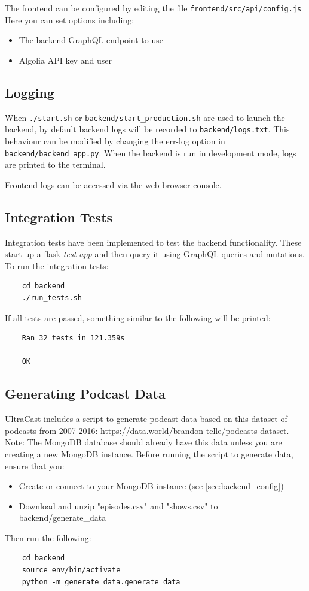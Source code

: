 \documentclass[../report.tex]{subfiles}
\begin{document}
The frontend can be configured by editing the file \verb|frontend/src/api/config.js| Here you can set options including:
\begin{itemize}
    \item The backend GraphQL endpoint to use
    \item Algolia API key and user
\end{itemize}

\subsection{Logging}

When \verb|./start.sh| or \verb|backend/start_production.sh| are used to launch the backend, by default backend logs will be recorded to \verb|backend/logs.txt|.
This behaviour can be modified by changing the err-log option in \verb|backend/backend_app.py|.
When the backend is run in development mode, logs are printed to the terminal.

Frontend logs can be accessed via the web-browser console.

\subsection{Integration Tests}

Integration tests have been implemented to test the backend functionality.
These start up a flask \textit{test app} and then query it using GraphQL queries and mutations.
\\
To run the integration tests:
\begin{verbatim}
    cd backend
    ./run_tests.sh
\end{verbatim}

If all tests are passed, something similar to the following will be printed:
\begin{verbatim}
    Ran 32 tests in 121.359s

    OK
\end{verbatim}

\subsection{Generating Podcast Data}

UltraCast includes a script to generate podcast data based on this dataset of podcasts
from 2007-2016: https://data.world/brandon-telle/podcasts-dataset. Note: The MongoDB
database should already have this data unless you are creating a new MongoDB instance.
Before running the script to generate data, ensure that you:
\begin{itemize}
    \item Create or connect to your MongoDB instance (see \cref{sec:backend_config})
    \item Download and unzip "episodes.csv" and "shows.csv" to backend/generate\_data
\end{itemize}
Then run the following:
\begin{verbatim}
    cd backend
    source env/bin/activate
    python -m generate_data.generate_data
\end{verbatim}
\end{document}
